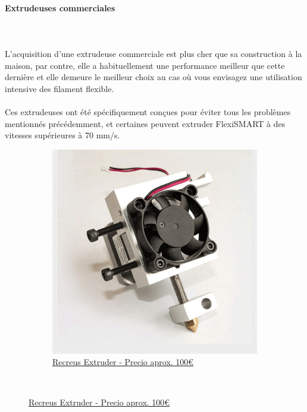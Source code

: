\documentclass[11pt,a4paper]{article}
\begin{document}
			\paragraph{Extrudeuses commerciales}\mbox{}\\\\
L’acquisition d’une extrudeuse commerciale est plus cher que sa construction à la maison, par contre, elle a habituellement une performance meilleur que cette dernière et elle demeure le meilleur choix au cas où vous envisagez une utilisation  intensive des filament flexible.
\\\\
Ces extrudeuses ont été spécifiquement conçues pour éviter tous les problèmes mentionnés précédemment, et certaines peuvent extruder FlexiSMART à des vitesses supérieures à 70 mm/s.
\begin{figure}[H]
    \centering
    \begin{subfigure}[b]{0.4\textwidth}
        \includegraphics[width=\textwidth,cfbox=azul_marcos 4pt 0pt]{FOTOS/EXTRUSOR5}
		\caption*{\href{http://www.recreus.com}{{\footnotesize Recreus Extruder - Precio aprox. 100\euro}}}
    \end{subfigure}
    ~ \qquad%

\end{figure}
\end{document}
